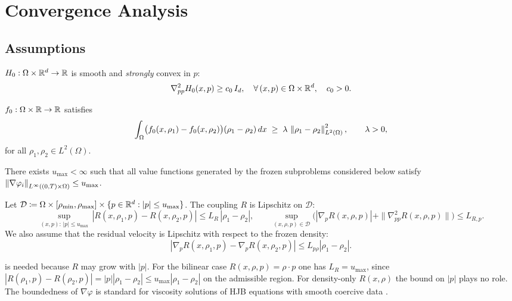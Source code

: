 \section{Convergence Analysis}
\label{sec:convergence}

\subsection{Assumptions}

\begin{assumption}\label{ass:base}
$H_0 : \Omega \times \mathbb{R}^d \to \mathbb{R}$ is smooth and \emph{strongly} convex in $p$:
\[
  \nabla^2_{pp} H_0(x,p) \geq c_0\, I_d, \quad \forall\, (x,p) \in \Omega \times \mathbb{R}^d,
  \quad c_0 > 0.
\]
\end{assumption}

\begin{assumption}\label{ass:mono}
$f_0 : \Omega \times \mathbb{R} \to \mathbb{R}$ satisfies
\[
  \int_\Omega \bigl(f_0(x,\rho_1) - f_0(x,\rho_2)\bigr)(\rho_1 - \rho_2)\,dx
  \;\geq\; \lambda\, \left\lVert \rho_1 - \rho_2 \right\rVert^2_{L^2(\Omega)},
  \qquad \lambda > 0,
\]
for all $\rho_1, \rho_2 \in L^2(\Omega)$.
\end{assumption}

\begin{assumption}\label{ass:pmax}
There exists $u_{\max} < \infty$ such that all value functions generated by
the frozen subproblems considered below satisfy
$\left\lVert \nabla\varphi_i \right\rVert_{L^\infty((0,T)\times\Omega)} \leq u_{\max}$.
\end{assumption}

\begin{assumption}\label{ass:lip}
Let
$
\mathcal{D} \coloneqq
\Omega \times [\rho_{\min},\rho_{\max}] \times \{p \in \mathbb{R}^d : |p| \leq u_{\max}\}
$.
The coupling $R$ is Lipschitz on $\mathcal{D}$:
\[
  \sup_{(x,p):\, |p| \leq u_{\max}}\,
   |R(x,\rho_1,p) - R(x,\rho_2,p)| \leq L_R\, |\rho_1 - \rho_2|,
  \qquad
  \sup_{(x,\rho,p) \in \mathcal{D}}
  \bigl(|\nabla_p R(x,\rho,p)|+\|\nabla^2_{pp}R(x,\rho,p)\|\bigr)
  \leq L_{R,p}.
\]
We also assume that the residual velocity is Lipschitz with respect to the
frozen density:
\[
  |\nabla_pR(x,\rho_1,p)-\nabla_pR(x,\rho_2,p)|
  \leq L_{p\rho}|\rho_1-\rho_2|.
\]
\end{assumption}
\begin{remark}
 is needed because $R$ may grow with $|p|$.
For the bilinear case $R(x,\rho,p) = \rho\cdot p$ one has
$L_R = u_{\max}$, since $|R(\rho_1,p)-R(\rho_2,p)| = |p||\rho_1-\rho_2|
\leq u_{\max}|\rho_1-\rho_2|$ on the admissible region.
For density-only $R(x,\rho)$ the bound on $|p|$ plays no role.
The boundedness of $\nabla\varphi$ is standard for viscosity solutions
of HJB equations with smooth coercive data
\citep{lasry2007mean,carmona2018probabilistic}.
\end{remark}

